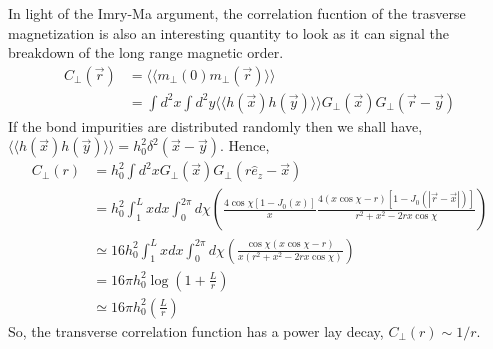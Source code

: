 \documentclass{article}
\newcommand{\vx}{\vec{x}}
\newcommand{\vy}{\vec{y}}
\newcommand{\vr}{\vec{r}}
\newcommand{\ue}{\hat{e}}
\begin{document}
In light of the Imry-Ma argument, the correlation fucntion 
of the trasverse magnetization is also an interesting
quantity to look as it can signal the breakdown of the 
long range magnetic order.
\begin{equation}
    \begin{aligned}
        C_\perp(\vr)&=\langle\langle
        m_\perp(0)m_\perp(\vr)\rangle\rangle \\
        &=\int d^2x\int d^2y
        \langle\langle h(\vx)h(\vy)
        \rangle\rangle
        G_\perp(\vx)G_\perp(\vr-\vy)
    \end{aligned}
\end{equation}
If the bond impurities are distributed randomly then we 
shall have, $\langle\langle h(\vx)h(\vy) \rangle\rangle
=h_0^2\delta^2(\vx-\vy)$. Hence,
\begin{equation}
    \begin{aligned}
        C_\perp(r) &=h_0^2\int d^2x
        G_\perp(\vx)G_\perp(r\ue_z-\vx) \\ 
        &= h_0^2\int^L_1 xdx\int^{2\pi}_0 d\chi
        \left(\frac{4\cos\chi[1-J_0(x)]}
        {x}\frac{4(x\cos\chi-r)[1-J_0(|\vr-\vx|)]}
    {r^2+x^2-2rx\cos\chi}\right) \\
        &\simeq 16h_0^2\int^L_1 xdx
        \int^{2\pi}_0d\chi
        \left(
            \frac{\cos\chi(x\cos\chi-r)}
            {x(r^2+x^2-2rx\cos\chi)}
        \right) \\
        &= 16\pi h^2_0\log\left(1+\frac{L}{r}\right) \\
        &\simeq16\pi h^2_0\left(\frac{L}{r}\right)
    \end{aligned}
\end{equation}
So, the transverse correlation function has a power lay 
decay, $C_\perp(r)\sim1/r$.
\end{document}
